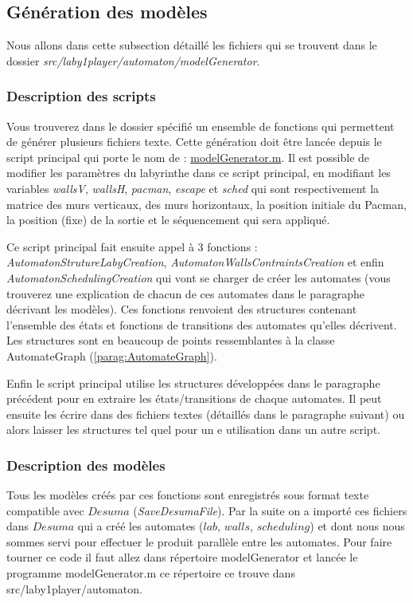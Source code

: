 \subsection{Génération des modèles} \label{subsec:generationModele}
\begin{center}
Nous allons dans cette subsection détaillé les fichiers qui se trouvent dans le dossier \emph{src/laby1player/automaton/modelGenerator}.
\end{center}
\subsubsection{Description des scripts} %
Vous trouverez dans le dossier spécifié un ensemble de fonctions qui permettent de générer plusieurs fichiers texte. Cette génération doit être lancée depuis le script principal qui porte le nom de : \underline{modelGenerator.m}. Il est possible de modifier les paramètres du labyrinthe dans ce script principal, en modifiant les variables \emph{wallsV}, \emph{wallsH}, \emph{pacman}, \emph{escape} et \emph{sched} qui sont respectivement la matrice des murs verticaux, des murs horizontaux, la position initiale du Pacman, la position (fixe) de la sortie et le séquencement qui sera appliqué.

Ce script principal fait ensuite appel à 3 fonctions : \emph{AutomatonStrutureLabyCreation}, \emph{AutomatonWallsContraintsCreation} et enfin \emph{AutomatonSchedulingCreation} qui vont se charger de créer les automates (vous trouverez une explication de chacun de ces automates dans le paragraphe décrivant les modèles). Ces fonctions renvoient des structures contenant l'ensemble des états et fonctions de transitions des automates qu'elles décrivent. Les structures sont en beaucoup de points ressemblantes à la classe AutomateGraph (\ref{parag:AutomateGraph}).


Enfin le script principal utilise les structures développées dans le paragraphe précédent pour en extraire les états/transitions de chaque automates. Il peut ensuite les écrire dans des fichiers textes (détaillés dans le paragraphe suivant) ou alors laisser les structures tel quel pour un e utilisation dans un autre script.


\subsubsection{Description des modèles}
Tous les modèles créés par ces fonctions sont enregistrés sous format texte compatible avec $Desuma$ (\emph{SaveDesumaFile}). Par la suite on a importé ces fichiers dans $Desuma$ qui a créé les automates ($lab$, $walls$, $scheduling$) et dont nous nous sommes servi pour effectuer le produit parallèle entre les automates. Pour faire tourner ce code il faut allez dans répertoire modelGenerator et lancée le programme modelGenerator.m ce répertoire ce trouve dans src/laby1player/automaton.

